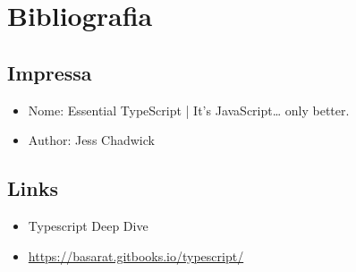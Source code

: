 \documentclass[11pt]{article}
\begin{document}
\section{Bibliografia}
\label{sec:org9d4b383}
\subsection{Impressa}
\label{sec:org9b56c01}

\begin{itemize}
\item Nome: Essential TypeScript | It’s JavaScript\ldots{} only better.
\item Author: Jess Chadwick
\end{itemize}

\subsection{Links}
\label{sec:org1a2b864}
\begin{itemize}
\item Typescript Deep Dive
\item \url{https://basarat.gitbooks.io/typescript/}
\end{itemize}
\end{document}
